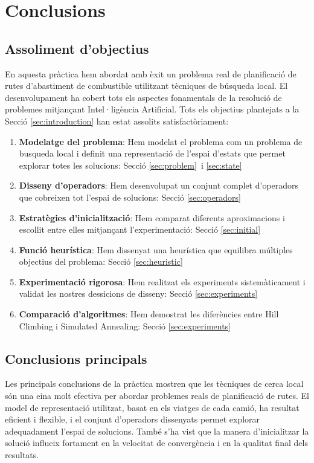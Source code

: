 \section{Conclusions}
\label{sec:conclusions}

\subsection{Assoliment d'objectius}

En aquesta pràctica hem abordat amb èxit un problema real de planificació de rutes d'abastiment de combustible utilitzant tècniques de búsqueda local. El desenvolupament ha cobert tots els aspectes fonamentals de la resolució de problemes mitjançant Intel·ligència Artificial. Tots els objectius plantejats a la Secció \ref{sec:introduction} han estat assolits satisfactòriament:

\begin{enumerate}
    \item \textbf{Modelatge del problema}: Hem modelat el problema com un problema de busqueda local i definit una representació de l'espai d'estats que permet explorar totes les solucions: Secció \ref{sec:problem}\ i \ref{sec:state} \
    
    \item \textbf{Disseny d'operadors}: Hem desenvolupat un conjunt complet d'operadors que cobreixen tot l'espai de solucions: Secció  \ref{sec:operadors} \
    
    \item \textbf{Estratègies d'inicialització}: Hem comparat diferents aproximacions i escollit entre elles mitjançant l'experimentació: Secció \ref{sec:initial} \
    
    \item \textbf{Funció heurística}: Hem dissenyat una heurística que equilibra múltiples objectius del problema: Secció \ref{sec:heuristic} \
    
    \item \textbf{Experimentació rigorosa}: Hem realitzat els experiments sistemàticament i validat les nostres dessicions de disseny: Secció  \ref{sec:experiments} \
    
    \item \textbf{Comparació d'algoritmes}: Hem demostrat les diferències entre Hill Climbing i Simulated Annealing: Secció \ref{sec:experiments} \
    
\end{enumerate}


\subsection{Conclusions principals}
Les principals conclusions de la pràctica mostren que les tècniques de cerca local són una eina molt efectiva per abordar problemes reals de planificació de rutes. El model de representació utilitzat, basat en els viatges de cada camió, ha resultat eficient i flexible, i el conjunt d’operadors dissenyats permet explorar adequadament l’espai de solucions. També s’ha vist que la manera d’inicialitzar la solució influeix fortament en la velocitat de convergència i en la qualitat final dels resultats.

